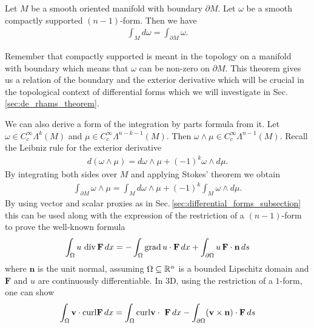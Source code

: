 \documentclass[../master_thesis.tex]{subfiles}
\begin{document}
\begin{theorem}[Stokes]
    Let $M$ be a smooth oriented manifold with boundary 
    $\partial M$. Let $\omega$ be 
    a smooth compactly supported $(n-1)$-form. Then we have 
    \begin{align*}
        \int_M d\omega = \int_{\partial M} \omega.
    \end{align*}
\end{theorem}
Remember that compactly supported is meant in the topology on a manifold with 
boundary which means that $\omega$ can be non-zero on $\partial M$.
This theorem gives us a relation of the boundary and the exterior derivative 
which will be crucial in the topological context of differential forms 
which we will investigate in Sec.\,\ref{sec:de_rhams_theorem}. 

We can also derive a form of the integration by parts formula from it. 
Let $\omega \in C_c^\infty \Lambda^k (M)$ and $\mu \in C_c^\infty \Lambda^{n-k-1}(M)$. 
Then $\omega \wedge \mu \in C_c^\infty \Lambda^{n-1} (M)$. Recall the 
Leibniz rule for the exterior derivative 
\begin{align*}
    d(\omega \wedge \mu) = d\omega \wedge \mu + (-1)^k \omega \wedge d\mu. 
\end{align*}
By integrating both sides over $M$ and applying Stokes' theorem we obtain
\begin{align*}
    \int_{\partial M} \omega \wedge \mu 
    = \int_M d\omega \wedge \mu + (-1)^k \int_M \omega \wedge d\mu.
\end{align*}
By using vector and scalar proxies as in Sec.\,\ref{sec:differential_forms_subsection}
this can be used along with the expression of the restriction of a $(n-1)$-form to 
prove the well-known formula
\begin{align*}
    \int_\Omega u\,\operatorname{div} \mathbf{F} \, dx 
    =  - \int_\Omega \operatorname{grad} u \cdot \mathbf{F} \, dx + 
        \int_{\partial \Omega } u \, \mathbf{F}\cdot \mathbf{n} \, ds
\end{align*}
where $\mathbf{n}$ is the unit normal, assuming $\Omega \subseteq \mathbb{R}^n$ is a bounded Lipschitz domain
and $\mathbf{F}$ and $u$ are continuously differentiable.
In 3D, using the restriction of a $1$-form, one can show
\begin{align*}
    \int_\Omega \mathbf{v} \cdot \mathbf{\operatorname{curl}} \mathbf{F} \, dx
    = \int_\Omega \mathbf{\operatorname{curl}} \mathbf{v} \cdot \ \mathbf{F} \, dx
        - \int_{\partial \Omega } (\mathbf{v} \times \mathbf{n})\cdot \mathbf{F} \, ds
\end{align*}
\end{document}
